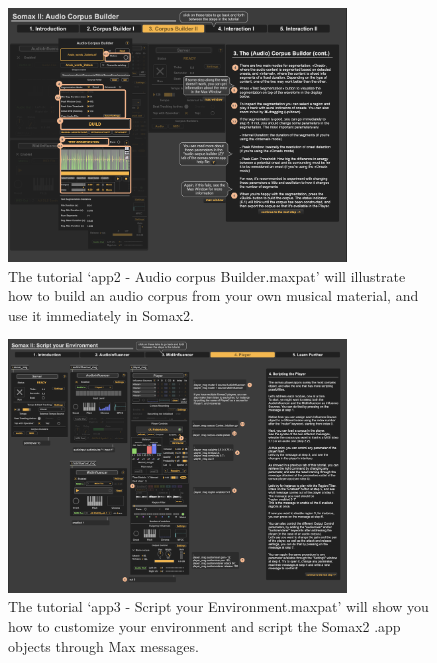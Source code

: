  \begin{figure}[H]
    \centering        
 	\includegraphics[width=0.8\textwidth]{img/app2_audiocorpusbuilder.png}
    \caption{The tutorial `app2 - Audio corpus Builder.maxpat' will illustrate how to build an audio corpus from your own musical material, and use it immediately in Somax2.}
    \label{fig:app2_audiocorpusbuilder}
\end{figure}

 \begin{figure}[H]
    \centering        
 	\includegraphics[width=0.8\textwidth]{img/app3_script_environment.png}
    \caption{The tutorial `app3 - Script your Environment.maxpat' will show you how to customize your environment and script the Somax2 .app objects through Max messages.}
    \label{fig:app3_script}
\end{figure}

